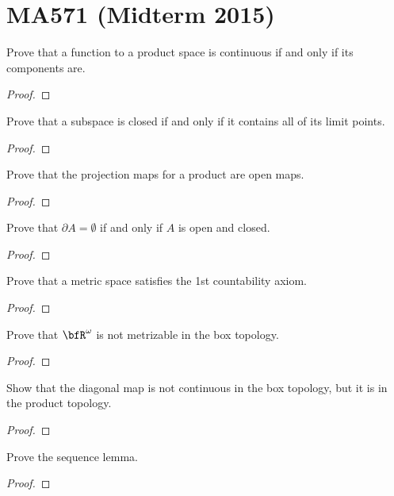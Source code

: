 \chapter{MA571 (Midterm 2015)}
\begin{problem}
Prove that a function to a product space is continuous if and only if its
components are.
\end{problem}
\begin{proof}
\end{proof}

\begin{problem}
Prove that a subspace is closed if and only if it contains all of its limit
points.
\end{problem}
\begin{proof}
\end{proof}

\begin{problem}
Prove that the projection maps for a product are open maps.
\end{problem}
\begin{proof}
\end{proof}

\begin{problem}
Prove that $\partial A=\emptyset$ if and only if $A$ is open and closed.
\end{problem}
\begin{proof}
\end{proof}

\begin{problem}
Prove that a metric space satisfies the 1st countability axiom.
\end{problem}
\begin{proof}
\end{proof}

\begin{problem}
Prove that $\bfR^\omega$ is not metrizable in the box topology.
\end{problem}
\begin{proof}
\end{proof}

\begin{problem}
Show that the diagonal map is not continuous in the box topology, but it is
in the product topology.
\end{problem}
\begin{proof}
\end{proof}

\begin{problem}
Prove the sequence lemma.
\end{problem}
\begin{proof}
\end{proof}


